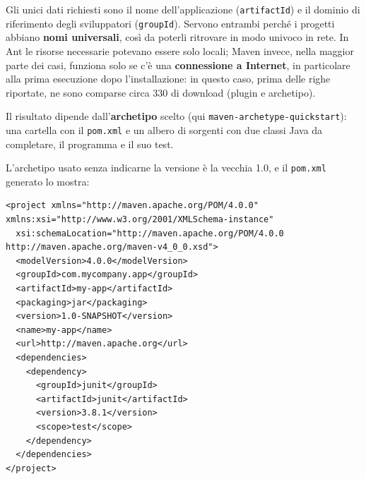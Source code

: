 Gli unici dati richiesti sono il nome dell'applicazione (\texttt{artifactId}) e il dominio di riferimento degli
sviluppatori (\texttt{groupId}). Servono entrambi perché i progetti abbiano \textbf{nomi universali}, così da poterli
ritrovare in modo univoco in rete. In Ant le risorse necessarie potevano essere solo locali; Maven invece, nella maggior
parte dei casi, funziona solo se c'è una \textbf{connessione a Internet}, in particolare alla prima esecuzione dopo
l'installazione: in questo caso, prima delle righe riportate, ne sono comparse circa 330 di download (plugin e
archetipo).

Il risultato dipende dall'\textbf{archetipo} scelto (qui \texttt{maven-archetype-quickstart}): una cartella con il
\texttt{pom.xml} e un albero di sorgenti con due classi Java da completare, il programma e il suo test.

\begin{center}
\end{center}

L'archetipo usato senza indicarne la versione è la vecchia 1.0, e il \texttt{pom.xml} generato lo mostra:

\begin{lstlisting}[style=xml, name=pom.xml]
<project xmlns="http://maven.apache.org/POM/4.0.0" xmlns:xsi="http://www.w3.org/2001/XMLSchema-instance"
  xsi:schemaLocation="http://maven.apache.org/POM/4.0.0 http://maven.apache.org/maven-v4_0_0.xsd">
  <modelVersion>4.0.0</modelVersion>
  <groupId>com.mycompany.app</groupId>
  <artifactId>my-app</artifactId>
  <packaging>jar</packaging>
  <version>1.0-SNAPSHOT</version>
  <name>my-app</name>
  <url>http://maven.apache.org</url>
  <dependencies>
    <dependency>
      <groupId>junit</groupId>
      <artifactId>junit</artifactId>
      <version>3.8.1</version>
      <scope>test</scope>
    </dependency>
  </dependencies>
</project>
\end{lstlisting}

